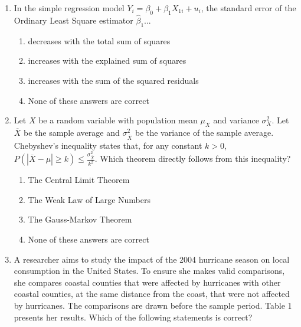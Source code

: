\documentclass{article}
\begin{document}
\begin{enumerate}
\begin{enumerate}[label=\alph*)]
\item \begin{equation*}
    \frac{\sum_i Y_iX_{1i}-\hat{\beta_0}\sum_i X_{1i}}{\sum_i X_{1i}^2}
\end{equation*}

\item \begin{equation*}
    \frac{\sum_i Y_iX_{1i}-\hat{\beta_0}\sum_i X_{1i}}{\sum_i (X_{1i}-\overline{X}_1)^2}
\end{equation*}

\end{enumerate}\vspace{.25cm}

\item In the simple regression model $Y_i = \beta_0 + \beta_1 X_{1i} + u_i$, the standard error of the Ordinary Least Square estimator $\hat{\beta}_1$...

\begin{enumerate}[label=\alph*)]
\item decreases with the total sum of squares
\item increases with the explained sum of squares
\item increases with the sum of the squared residuals
\item None of these answers are correct
\end{enumerate}\vspace{.25cm}

\item Let $X$ be a random variable with population mean $\mu_X$ and variance $\sigma^2_{X}$. Let $\overline{X}$ be the sample average and $\sigma^2_{\overline{X}}$ be the variance of the sample average. Chebyshev’s inequality states that, for any constant $k>0$, $P\left( |\overline{X} - \mu| \geq k \right) \leq \frac{\sigma^2_{\overline{X}}}{k^2}$. Which theorem directly follows from this inequality?

\begin{enumerate}[label=\alph*)]
\item The Central Limit Theorem
\item The Weak Law of Large Numbers
\item The Gauss-Markov Theorem 
\item None of these answers are correct
\end{enumerate}\vspace{.25cm}



\item A researcher aims to study the impact of the 2004 hurricane season on local consumption in the United States. To ensure she makes valid comparisons, she compares coastal counties that were affected by hurricanes with other coastal counties, at the same distance from the coast, that were not affected by hurricanes. The comparisons are drawn before the sample period. Table 1 presents her results. Which of the following statements is correct?


\end{enumerate}
\end{document}
